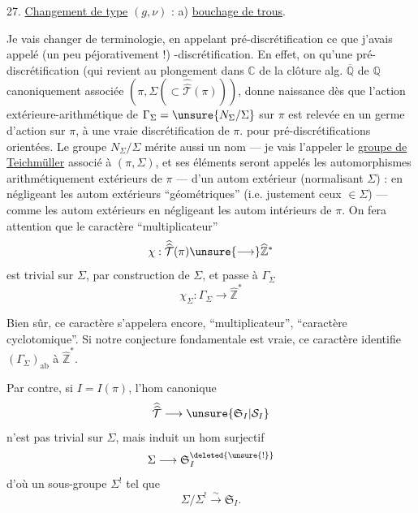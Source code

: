 27. \uline{Changement de type} $(g,\nu)$ : a) \uline{bouchage de trous}.

Je vais changer de terminologie, en appelant
pré-discrétification ce que j'avais appelé (un peu
péjorativement !) -discrétification. En effet, on
 qu'une pré-discrétification  (qui revient 
au plongement  dans $\mathbb C$ de la clôture alg. $\overline{\mathbb Q}$ de $\mathbb Q$
canoniquement associée  $(\pi,\Sigma(\subset\widehat{\widehat{\mathcal T}}(\pi)))$, donne
naissance dès que l'action extérieure-arithmétique de
$\Gamma_\Sigma=\unsure{N_\Sigma/\Sigma}$ sur $\pi$ est relevée en un germe d'action
sur $\pi$, à une vraie discrétification de $\pi$.  pour
pré-discrétifications orientées. Le groupe $N_\Sigma/\Sigma$ mérite
aussi un nom --- je vais l'appeler le \uline{groupe de}
\uline{Teichmüller}  associé à $(\pi,\Sigma)$, et
ses éléments seront appelés les automorphismes
arithmétiquement extérieurs de $\pi$ ---  d'un
autom extérieur (normalisant $\Sigma$) : en négligeant les
autom extérieurs ``géométriques'' (i.e. justement ceux
$\in\Sigma$) ---  comme les autom extérieurs  
 en négligeant les autom intérieurs de $\pi$.
On  fera attention que le caractère ``multiplicateur''
\[
\chi:\widehat{\widehat{\mathcal T}}(\pi)\unsure{\longrightarrow}\widehat{\mathbb Z}^{*}
\]
est trivial sur $\Sigma$, par construction de $\Sigma$, et
passe à $\Gamma_\Sigma$
\[
\chi_\Sigma:\Gamma_\Sigma\longrightarrow\widehat{\mathbb Z}^{*}
\]

Bien sûr, ce caractère s'appelera encore, ``multiplicateur'',  ``caractère cyclotomique''.  Si notre conjecture fondamentale est vraie, ce caractère identifie $(\Gamma_\Sigma)_{\mathrm{ab}}$ à $\widehat{\mathbb Z}^{*}$.

Par contre, si $I=I(\pi)$, l'hom canonique
\[
\widehat{\widehat{\mathcal T}}\longrightarrow\unsure{\mathfrak S_I|\mathcal S_I}
\]
n'est  pas trivial sur $\Sigma$, mais induit un hom surjectif
\[
\Sigma\longrightarrow\mathfrak S_I^{\deleted{\unsure{!}}}
\]
d'où un sous-groupe $\Sigma^!$ tel que
\[
\Sigma/\Sigma^!\xrightarrow{\sim}\mathfrak S_I.
\]


